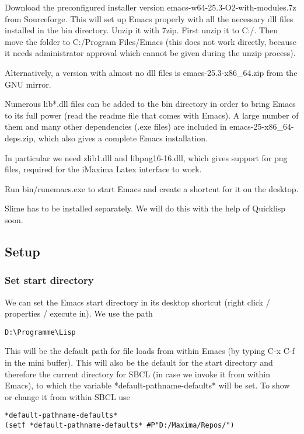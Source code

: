 \documentclass[../Maxima_Workbook.tex]{subfiles}
\begin{document}
Download the preconfigured installer version emacs-w64-25.3-O2-with-modules.7z from Sourceforge. This will set up Emacs properly with all the necessary dll files installed in the bin directory. Unzip it with 7zip. First unzip it to C:/. Then move the folder to C:/Program Files/Emacs (this does not work directly, because it needs administrator approval which cannot be given during the unzip process).

\lz Alternatively, a version with almost no dll files is emacs-25.3-x86\_64.zip from the GNU mirror. 

\lz Numerous lib*.dll files can be added to the bin directory in order to bring Emacs to its full power (read the readme file that comes with Emacs). A large number of them and many other dependencies (.exe files) are included in emacs-25-x86\_64-deps.zip, which also gives a complete Emacs installation. 

\lz In particular we need zlib1.dll and libpng16-16.dll, which gives support for png files, required for the iMaxima Latex interface to work.

\lz Run bin/runemacs.exe to start Emacs and create a shortcut for it on the desktop.

\lz Slime has to be installed separately. We will do this with the help of Quicklisp soon.

\subsection{Setup}

\subsubsection{Set start directory}\label{EE1a}

We can set the Emacs start directory in its desktop shortcut (right click / properties / execute in). We use the path

\begin{lstlisting}[style=lisp]
D:\Programme\Lisp
\end{lstlisting}

This will be the default path for file loads from within Emacs (by typing C-x C-f in the mini buffer). This will also be the default for the start directory and therefore the current directory for SBCL (in case we invoke it from within Emacs), to which the variable *default-pathname-defaults* will be set. To show or change it from within SBCL use

\begin{lstlisting}[style=lisp]
*default-pathname-defaults*
(setf *default-pathname-defaults* #P"D:/Maxima/Repos/")
\end{lstlisting}
\end{document}
